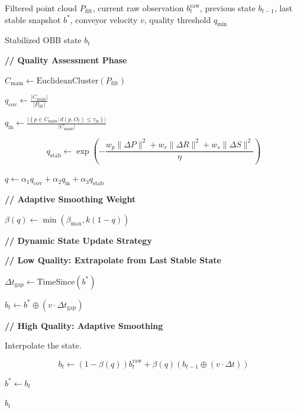 \begin{algorithm}[t]
\caption{Consistency-Aware OBB Stabilization (CAOS)}
\label{alg:caos}
\begin{algorithmic}[1]

\Require Filtered point cloud $P_{\text{filt}}$,
current raw observation $b_t^{\text{raw}}$,
previous state $b_{t-1}$,
last stable snapshot $b^{*}$,
conveyor velocity $v$,
quality threshold $q_{\text{min}}$

\Ensure Stabilized OBB state $b_t$

\State \textbf{// Quality Assessment Phase}

\State
$C_{\text{main}}
\gets
\mathrm{EuclideanCluster}(P_{\text{filt}})$

\State
$q_{\text{cov}}
\gets
\frac{|C_{\text{main}}|}{|P_{\text{filt}}|}$

\State
$q_{\text{in}}
\gets
\frac{
\left|
\left\{
p\in C_{\text{main}} :
d(p,O_t)\le \tau_{\text{in}}
\right\}
\right|
}
{|C_{\text{main}}|}
$

\State
\[
q_{\text{stab}}
\gets
\exp\!\left(
-\frac{
w_p\|\Delta P\|^2
+
w_r\|\Delta R\|^2
+
w_s\|\Delta S\|^2
}
{\eta}
\right)
\]

\State
$q
\gets
\alpha_1 q_{\text{cov}}
+
\alpha_2 q_{\text{in}}
+
\alpha_3 q_{\text{stab}}$

\State \textbf{// Adaptive Smoothing Weight}

\State
$\beta(q)
\gets
\min\!\left(
\beta_{\text{max}},
k(1-q)
\right)$

\State \textbf{// Dynamic State Update Strategy}


    \State \textbf{// Low Quality: Extrapolate from Last Stable State}

    \State
    $\Delta t_{\text{gap}}
    \gets
    \mathrm{TimeSince}(b^{*})$

    \State
    $b_t
    \gets
    b^{*}
    \oplus
    \left(v\cdot\Delta t_{\text{gap}}\right)$

\Else

    \State \textbf{// High Quality: Adaptive Smoothing}

    \State Interpolate the state.

    \State
    \[
    b_t
    \gets
    \left(1-\beta(q)\right)b_t^{\text{raw}}
    +
    \beta(q)
    \left(
    b_{t-1}
    \oplus
    (v\cdot\Delta t)
    \right)
    \]

    \State
    $b^{*} \gets b_t$

\EndIf

\State \Return $b_t$

\end{algorithmic}
\end{algorithm}

